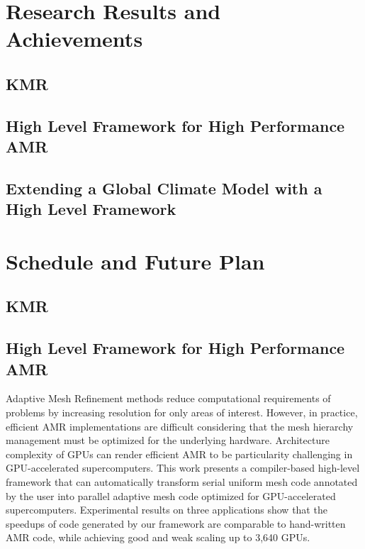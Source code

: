 \documentclass{book}
\begin{document}
\section{Research Results and Achievements}

\subsection{KMR}

\subsection{High Level Framework for High Performance AMR}

\subsection{Extending a Global Climate Model with a High Level Framework}


\section{Schedule and Future Plan}

\subsection{KMR}

\subsection{High Level Framework for High Performance AMR}
Adaptive Mesh Refinement methods reduce computational requirements of problems by increasing resolution for only areas of interest. However, in practice, efficient AMR implementations are difficult considering that the mesh hierarchy management must be optimized for the underlying hardware. Architecture complexity of GPUs can render efficient AMR to be particularity challenging in GPU-accelerated supercomputers. This work presents a compiler-based high-level framework that can automatically transform serial uniform mesh code annotated by the user into parallel adaptive mesh code optimized for GPU-accelerated supercomputers. Experimental results on three applications show that the speedups of code generated by our framework are comparable to hand-written AMR code, while achieving good and weak scaling up to 3,640 GPUs.
\end{document}
